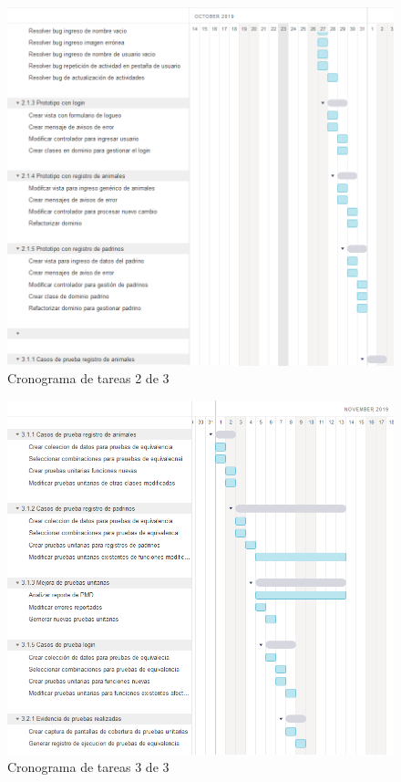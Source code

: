 \begin{figure}[H]
    \centering
    \includegraphics[scale=0.5]{Files/gannt2.png}
    \caption{Cronograma de tareas 2 de 3}
    \label{fig:clases}
\end{figure}


\begin{figure}[H]
    \centering
    \includegraphics[scale=0.5]{Files/gannt3.png}
    \caption{Cronograma de tareas 3 de 3}
    \label{fig:clases}
\end{figure}
